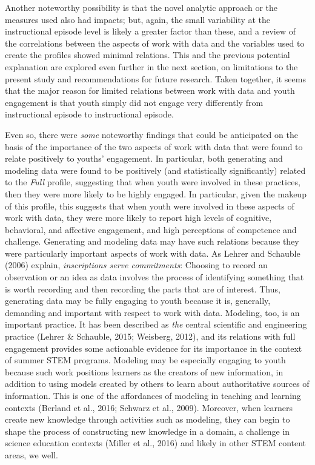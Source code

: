 \documentclass[]{book}
\theoremstyle{definition}
\theoremstyle{definition}
\theoremstyle{definition}
\theoremstyle{remark}
\begin{document}
Another noteworthy possibility is that the novel analytic approach or
the measures used also had impacts; but, again, the small variability at
the instructional episode level is likely a greater factor than these,
and a review of the correlations between the aspects of work with data
and the variables used to create the profiles showed minimal relations.
This and the previous potential explanation are explored even further in
the next section, on limitations to the present study and
recommendations for future research. Taken together, it seems that the
major reason for limited relations between work with data and youth
engagement is that youth simply did not engage very differently from
instructional episode to instructional episode.

Even so, there were \emph{some} noteworthy findings that could be
anticipated on the basis of the importance of the two aspects of work
with data that were found to relate positively to youths' engagement. In
particular, both generating and modeling data were found to be
positively (and statistically significantly) related to the \emph{Full}
profile, suggesting that when youth were involved in these practices,
then they were more likely to be highly engaged. In particular, given
the makeup of this profile, this suggests that when youth were involved
in these aspects of work with data, they were more likely to report high
levels of cognitive, behavioral, and affective engagement, and high
perceptions of competence and challenge. Generating and modeling data
may have such relations because they were particularly important aspects
of work with data. As Lehrer and Schauble (2006) explain,
\emph{inscriptions serve commitments}: Choosing to record an observation
or an idea as data involves the process of identifying something that is
worth recording and then recording the parts that are of interest. Thus,
generating data may be fully engaging to youth because it is, generally,
demanding and important with respect to work with data. Modeling, too,
is an important practice. It has been described as \emph{the} central
scientific and engineering practice (Lehrer \& Schauble, 2015; Weisberg,
2012), and its relations with full engagement provides some actionable
evidence for its importance in the context of summer STEM programs.
Modeling may be especially engaging to youth because such work positions
learners as the creators of new information, in addition to using models
created by others to learn about authoritative sources of information.
This is one of the affordances of modeling in teaching and learning
contexts (Berland et al., 2016; Schwarz et al., 2009). Moreover, when
learners create new knowledge through activities such as modeling, they
can begin to shape the process of constructing new knowledge in a
domain, a challenge in science education contexts (Miller et al., 2016)
and likely in other STEM content areas, we well.
\end{document}
